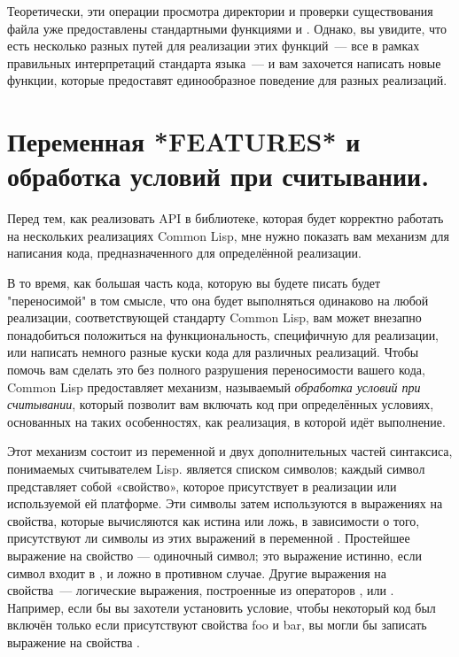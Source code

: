 Теоретически, эти операции просмотра директории и проверки существования файла уже
предоставлены стандартными функциями  и . Однако, вы
увидите, что есть несколько разных путей для реализации этих функций~--- все в рамках
правильных интерпретаций стандарта языка~--- и вам захочется написать новые функции,
которые предоставят единообразное поведение для разных реализаций.

\section{Переменная *FEATURES* и обработка условий при считывании.}

Перед тем, как реализовать API в библиотеке, которая будет корректно работать на
нескольких реализациях Common Lisp, мне нужно показать вам механизм для написания кода,
предназначенного для определённой реализации.

В то время, как большая часть кода, которую вы будете писать будет "переносимой" в том
смысле, что она будет выполняться одинаково на любой реализации, соответствующей стандарту
Common Lisp, вам может внезапно понадобиться положиться на функциональность, специфичную
для реализации, или написать немного разные куски кода для различных реализаций. Чтобы
помочь вам сделать это без полного разрушения переносимости вашего кода, Common Lisp
предоставляет механизм, называемый \textit{обработка условий при считывании}, который
позволит вам включать код при определённых условиях, основанных на таких особенностях, как
реализация, в которой идёт выполнение.

Этот механизм состоит из переменной  и двух дополнительных частей
синтаксиса, понимаемых считывателем Lisp.  является списком символов;
каждый символ представляет собой «свойство», которое присутствует в реализации или
используемой ей платформе. Эти символы затем используются в выражениях на свойства,
которые вычисляются как истина или ложь, в зависимости о того, присутствуют ли символы из
этих выражений в переменной . Простейшее выражение на свойство ---
одиночный символ; это выражение истинно, если символ входит в , и ложно в
противном случае. Другие выражения на свойства~--- логические выражения, построенные из
операторов ,  или . Например, если бы вы захотели установить
условие, чтобы некоторый код был включён только если присутствуют свойства foo и bar, вы
могли бы записать выражение на свойства .

